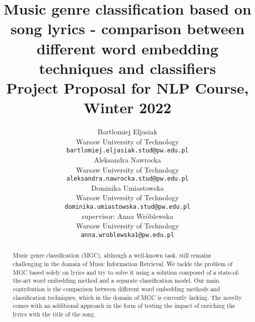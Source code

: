 \documentclass[11pt]{article}
\title{Music genre classification based on song lyrics - comparison between different word embedding techniques and classifiers \\Project Proposal for NLP Course, Winter 2022}
\author{Bartłomiej Eljasiak \\
  Warsaw University of Technology \\
  {\tt\small bartlomiej.eljasiak.stud@pw.edu.pl} \\\And
  Aleksandra Nawrocka \\
  Warsaw University of Technology \\
  {\tt\small aleksandra.nawrocka.stud@pw.edu.pl} \\
  \AND
  Dominika Umiastowska \\
  Warsaw University of Technology \\
  {\tt\small dominika.umiastowska.stud@pw.edu.pl} \\\And 
  supervisor: Anna Wróblewska\\
  Warsaw University of Technology \\
  {\tt\small anna.wroblewska1@pw.edu.pl}\\}
\date{}
\begin{document}
\raggedbottom

\maketitle

\vspace{5em}

\begin{abstract}

Music genre classification (MGC), although a well-known task, still remains challenging in the domain of Music Information Retrieval. We tackle the problem of MGC based solely on lyrics and try to solve it using a solution composed of a state-of-the-art word embedding method and a separate classification model. Our main contribution is the comparison between different word embedding methods and classification techniques, which in the domain of MGC is currently lacking. The novelty comes with an additional approach in the form of testing the impact of enriching the lyrics with the title of the song.

\end{abstract}















\printbibliography


\end{document}
